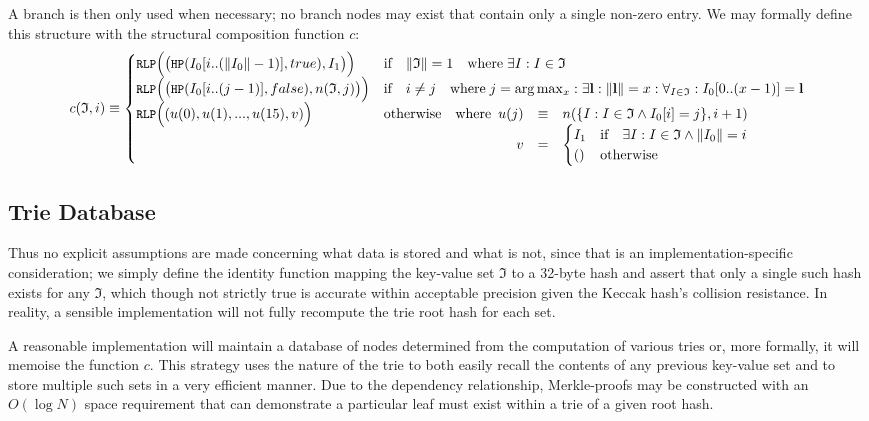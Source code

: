 \documentclass[9pt,oneside]{amsart}
\begin{document}
A branch is then only used when necessary; no branch nodes may exist that contain only a single non-zero entry. We may formally define this structure with the structural composition function $c$:
\begin{equation}
c(\mathfrak{I}, i) \equiv \begin{cases}
\texttt{\small RLP}\Big( \big(\texttt{\small HP}(I_0[i .. (\lVert I_0\rVert - 1)], true), I_1 \big) \Big) & \text{if} \quad \lVert \mathfrak{I} \rVert = 1 \quad \text{where} \; \exists I: I \in \mathfrak{I} \\
\texttt{\small RLP}\Big( \big(\texttt{\small HP}(I_0[i .. (j - 1)], false), n(\mathfrak{I}, j) \big) \Big) & \text{if} \quad i \ne j \quad \text{where} \; j = \arg \max_x : \exists \mathbf{l}: \lVert \mathbf{l} \rVert = x : \forall_{I \in \mathfrak{I}}: I_0[0 .. (x - 1)] = \mathbf{l} \\
\texttt{\small RLP}\Big( (u(0), u(1), ..., u(15), v) \Big) & \text{otherwise} \quad \text{where} \begin{array}[t]{rcl}
u(j) & \equiv & n(\{ I : I \in \mathfrak{I} \wedge I_0[i] = j \}, i + 1) \\
v & = & \begin{cases}
I_1 & \text{if} \quad \exists I: I \in \mathfrak{I} \wedge \lVert I_0 \rVert = i \\
() & \text{otherwise}
\end{cases}
\end{array}
\end{cases}
\end{equation}

\subsection{Trie Database}
Thus no explicit assumptions are made concerning what data is stored and what is not, since that is an implementation-specific consideration; we simply define the identity function mapping the key-value set $\mathfrak{I}$ to a 32-byte hash and assert that only a single such hash exists for any $\mathfrak{I}$, which though not strictly true is accurate within acceptable precision given the Keccak hash's collision resistance. In reality, a sensible implementation will not fully recompute the trie root hash for each set.

A reasonable implementation will maintain a database of nodes determined from the computation of various tries or, more formally, it will memoise the function $c$. This strategy uses the nature of the trie to both easily recall the contents of any previous key-value set and to store multiple such sets in a very efficient manner. Due to the dependency relationship, Merkle-proofs may be constructed with an $O(\log N)$ space requirement that can demonstrate a particular leaf must exist within a trie of a given root hash.
\end{document}
